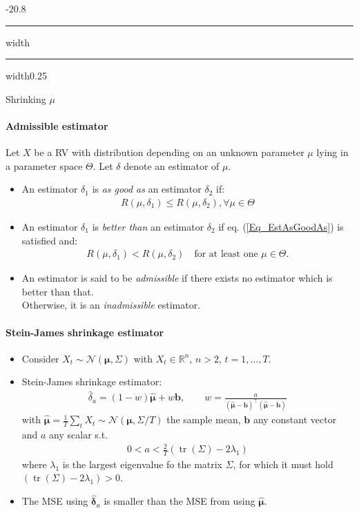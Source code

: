 \documentclass[a4paper,landscape,8pt,fleqn]{scrartcl}
\makeatletter
\renewcommand{\subsection}{\@startsection{subsection}{1}{0mm}%
{-2\baselineskip}{0.8\baselineskip}%
{\hrule depth 0.2pt width\columnwidth\hrule depth0.75pt
width0.25\columnwidth\vspace*{1.2em}\large\bfseries}}
\DeclareMathOperator{\tr}{tr}						%
\makeatother
\begin{document}
\begin{multicols*}{3}
\subsection{Shrinking $\mu$}

\paragraph{Admissible estimator}
Let $X$ be a RV with distribution depending on an unknown parameter $\mu$ lying in a parameter space $\Theta$. Let $\delta$ denote an estimator of $\mu$.
\begin{itemize}
\item An estimator $\delta_1$ is \textit{as good as} an estimator $\delta_2$ if:
\begin{align}
R(\mu,\delta_1) \leq R(\mu,\delta_2), \forall \mu \in \Theta
\label{Eq_EstAsGoodAs}
\end{align}
\item An estimator $\delta_1$ is \textit{better than} an estimator $\delta_2$ if eq. (\ref{Eq_EstAsGoodAs}) is satisfied and:
\begin{align*}
R(\mu,\delta_1) < R(\mu,\delta_2) \quad \text{for at least one } \mu \in \Theta.
\end{align*}
\item An estimator is said to be \textit{admissible} if there exists no estimator which is better than that. \\
Otherwise, it is an \textit{inadmissible} estimator.
\end{itemize}

\paragraph{Stein-James shrinkage estimator}
\begin{itemize}
\item Consider $X_t \sim \mathcal{N}(\bm \mu, \Sigma)$ with $X_t \in \mathbb{R}^n$, $n > 2$, $t = 1, \ldots, T$.
\item Stein-James shrinkage estimator:
\begin{align*}
\hat \delta_a = (1-w) \bm{\hat \mu} + w \bm b, \qquad w = \frac{a}{(\bm{\hat \mu} - \bm b)^\top (\bm{\hat \mu} - \bm b)}
\end{align*}
with $\bm{\hat \mu} = \frac{1}{T} \sum_t X_t \sim \mathcal{N}(\bm \mu, \Sigma/T)$ the sample mean, $\bm b$ any constant vector and $a$ any scalar s.t.
\begin{align*}
0 < a < \frac{2}{T} (\tr(\Sigma) - 2 \lambda_1)
\end{align*}
where $\lambda_1$ is the largest eigenvalue fo the matrix $\Sigma$, for which it must hold $(\tr(\Sigma) - 2 \lambda_1) > 0$.
\item The MSE using $\bm{\hat \delta}_a$ is smaller than the MSE from using $\bm{\hat \mu}$.
\end{itemize}


\end{multicols*}
\end{document}
